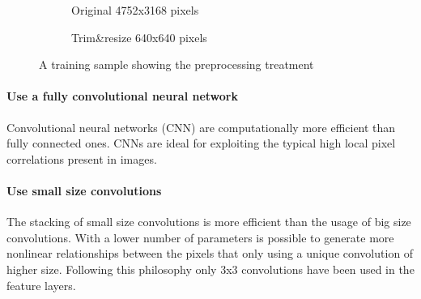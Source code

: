 \documentclass[preprint]{elsarticle}
\theoremstyle{definition} %
\theoremstyle{remark}
\begin{document}
\begin{figure}[h]
	\centering
	\begin{subfigure}[b]{.45\textwidth}
			\centering
			\caption{Original 4752x3168 pixels}	
	\end{subfigure}
	\begin{subfigure}[b]{.40\textwidth}
			\centering
			\caption{Trim\&resize 640x640 pixels}
	\end{subfigure}
	\caption{A training sample showing the preprocessing treatment}
	\label{fig:preprocessing}
\end{figure}

\paragraph{Use a fully convolutional neural network} Convolutional neural networks (CNN) are computationally more efficient than fully connected ones. CNNs are ideal for exploiting the typical high local pixel correlations present in images.

\paragraph{Use small size convolutions} The stacking of small size convolutions is more efficient than the usage of big size convolutions. With a lower number of parameters is possible to generate more nonlinear relationships between the pixels that only using a unique convolution of higher size. Following this philosophy only 3x3 convolutions have been used in the feature layers. 
\end{document}
